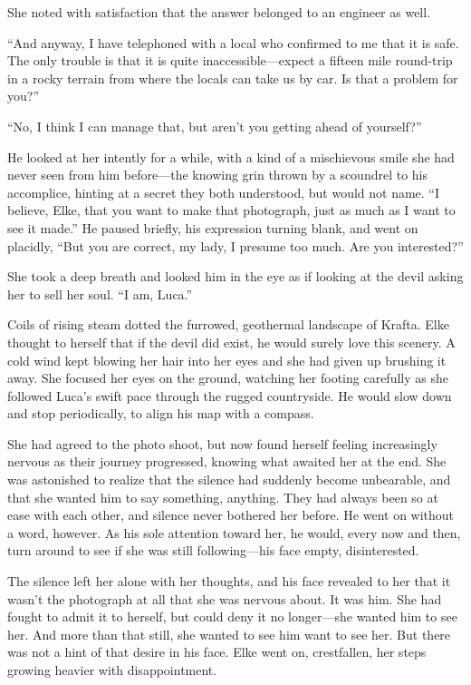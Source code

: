 She noted with satisfaction that the answer belonged to an engineer as well.

``And anyway, I have telephoned with a local who confirmed to me that it is safe. The only trouble is that it is quite inaccessible---expect a fifteen mile round-trip in a rocky terrain from where the locals can take us by car. Is that a problem for you?''

``No, I think I can manage that, but aren't you getting ahead of yourself?''

He looked at her intently for a while, with a kind of a mischievous smile she had never seen from him before---the knowing grin thrown by a scoundrel to his accomplice, hinting at a secret they both understood, but would not name. ``I believe, Elke, that you want to make that photograph, just as much as I want to see it made.'' He paused briefly, his expression turning blank, and went on placidly, ``But you are correct, my lady, I presume too much. Are you interested?''

She took a deep breath and looked him in the eye as if looking at the devil asking her to sell her soul. ``I am, Luca.''

\sectionline

Coils of rising steam dotted the furrowed, geothermal landscape of Krafta. Elke thought to herself that if the devil did exist, he would surely love this scenery. A cold wind kept blowing her hair into her eyes and she had given up brushing it away. She focused her eyes on the ground, watching her footing carefully as she followed Luca's swift pace through the rugged countryside. He would slow down and stop periodically, to align his map with a compass.

She had agreed to the photo shoot, but now found herself feeling increasingly nervous as their journey progressed, knowing what awaited her at the end. She was astonished to realize that the silence had suddenly become unbearable, and that she wanted him to say something, anything. They had always been so at ease with each other, and silence never bothered her before. He went on without a word, however. As his sole attention toward her, he would, every now and then, turn around to see if she was still following---his face empty, disinterested.

The silence left her alone with her thoughts, and his face revealed to her that it wasn't the photograph at all that she was nervous about. It was him. She had fought to admit it to herself, but could deny it no longer---she wanted him to see her. And more than that still, she wanted to see him want to see her. But there was not a hint of that desire in his face. Elke went on, crestfallen, her steps growing heavier with disappointment.

